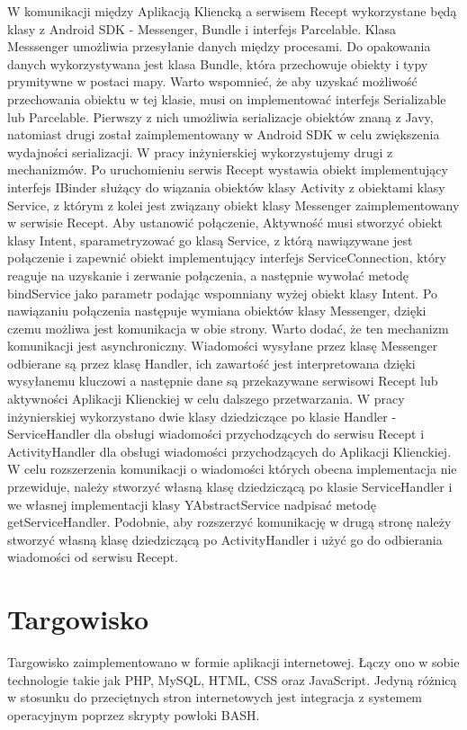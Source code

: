 \documentclass[11pt,a4paper,polish,thesis]{dcsbook}
\begin{document}
W komunikacji między Aplikacją Kliencką a serwisem Recept wykorzystane będą klasy z Android SDK - Messenger, Bundle i interfejs Parcelable. Klasa Messsenger umożliwia przesyłanie danych między procesami. \cite{android.mesage} Do opakowania danych wykorzystywana jest klasa Bundle, która przechowuje obiekty i typy prymitywne w postaci mapy. Warto wspomnieć, że aby uzyskać możliwość przechowania obiektu w tej klasie, musi on implementować interfejs Serializable lub Parcelable. Pierwszy z nich umożliwia serializacje obiektów znaną z Javy, natomiast drugi został zaimplementowany w Android SDK w celu zwiększenia wydajności serializacji. W pracy inżynierskiej wykorzystujemy drugi z mechanizmów. Po uruchomieniu serwis Recept wystawia obiekt implementujący interfejs IBinder służący do wiązania obiektów klasy Activity z obiektami klasy Service,  z którym z kolei jest związany obiekt klasy Messenger zaimplementowany w serwisie Recept. Aby ustanowić połączenie, Aktywność musi stworzyć obiekt klasy Intent, sparametryzować go klasą Service, z którą nawiązywane jest połączenie i zapewnić obiekt implementujący interfejs ServiceConnection, który reaguje na uzyskanie i zerwanie połączenia, a następnie wywołać metodę bindService jako parametr podając wspomniany wyżej obiekt klasy Intent. Po nawiązaniu połączenia następuje wymiana obiektów klasy Messenger, dzięki czemu możliwa jest komunikacja w obie strony. Warto dodać, że ten mechanizm komunikacji jest asynchroniczny. Wiadomości wysyłane przez klasę Messenger odbierane są przez klasę Handler, ich zawartość jest interpretowana dzięki wysyłanemu kluczowi a następnie dane są przekazywane serwisowi Recept lub aktywności Aplikacji Klienckiej w celu dalszego przetwarzania. W pracy inżynierskiej wykorzystano dwie klasy dziedziczące po klasie Handler - ServiceHandler dla obsługi wiadomości przychodzących do serwisu Recept i ActivityHandler dla obsługi wiadomości przychodzących do Aplikacji Klienckiej. W celu rozszerzenia komunikacji o wiadomości których obecna implementacja nie przewiduje, należy stworzyć własną klasę dziedziczącą po klasie ServiceHandler i we własnej implementacji klasy YAbstractService nadpisać metodę getServiceHandler. Podobnie, aby rozszerzyć komunikację w drugą stronę należy stworzyć własną klasę dziedziczącą po ActivityHandler i użyć go do odbierania wiadomości od serwisu Recept.
\section{Targowisko}
Targowisko zaimplementowano w formie aplikacji internetowej. Łączy ono w sobie technologie takie jak PHP, MySQL, HTML, CSS oraz JavaScript. Jedyną różnicą w stosunku
do przeciętnych stron internetowych jest integracja z systemem operacyjnym poprzez skrypty powłoki BASH.
\end{document}
